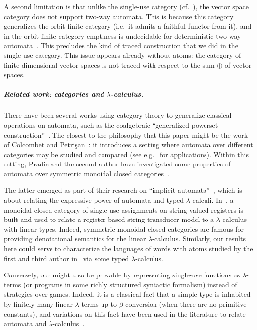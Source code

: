 \documentclass[a4paper,UKenglish,cleveref, autoref, numberwithinsect, thm-restate]{lipics-v2021}
\begin{document}
A second limitation is that unlike the single-use category (cf.\ ), the vector space category does not support two-way automata. This is because this category generalizes the orbit-finite category (i.e.~it admits a faithful functor from it), and in the orbit-finite category emptiness is undecidable for deterministic two-way automata~\cite[Theorem 5.3]{nevenFiniteStateMachines2004}. This precludes the kind of traced construction that we did in the single-use category. This issue appears already without atoms: the category of finite-dimensional vector spaces is not traced with respect to the sum $\oplus$ of vector spaces. 

\subparagraph{Related work: categories and $\lambda$-calculus.}

There have been several works using category theory to generalize classical operations on automata, such as the coalgebraic ``generalized powerset construction''~\cite{DBLP:journals/corr/abs-1302-1046}. The closest to the philosophy that this paper might be the work of Colcombet and Petrişan~\cite{colcombet2020automata}: it introduces a setting where automata over different categories may be studied and compared (see e.g.~\cite{Aristote24} for applications). Within this setting, Pradic and the second author have investigated some properties of automata over symmetric monoidal closed categories~\cite[Sections~1.2.3~and~4.7--4.8]{titoPhD}.

The latter emerged as part of their research on ``implicit automata''~\cite{IATLC,titoPhD,pradic2024implicit}, which is about relating the expressive power of automata and typed $\lambda$-calculi. In~\cite[Chapter~4]{titoPhD}, a monoidal closed category of single-use assignments on string-valued registers is built and used to relate a register-based string transducer model to a $\lambda$-calculus with linear types. Indeed, symmetric monoidal closed categories are famous for providing denotational semantics for the linear $\lambda$-calculus. Similarly, our results here could serve to characterize the languages of words with atoms studied by the first and third author in~\cite{bojanczykstefanski2020} via some typed $\lambda$-calculus.

Conversely, our  might also be provable by representing single-use functions as $\lambda$-terms (or programs in some richly structured syntactic formalism) instead of strategies over games. Indeed, it is a classical fact that a simple type is inhabited by finitely many linear $\lambda$-terms up to $\beta$-conversion (when there are no primitive constants), and variations on this fact have been used in the literature to relate automata and $\lambda$-calculus~\cite{IATLC,LambdaTransducer}.




\end{document}
